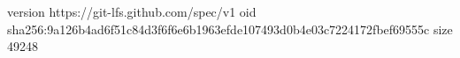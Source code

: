 version https://git-lfs.github.com/spec/v1
oid sha256:9a126b4ad6f51c84d3f6f6e6b1963efde107493d0b4e03c7224172fbef69555c
size 49248
